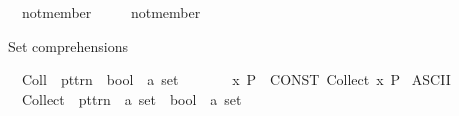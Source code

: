 \begin{isabellebody}
\ \ not{\isacharunderscore}{\kern0pt}member\ \ {\isacharparenleft}{\kern0pt}{\isachardoublequoteopen}{\isacharprime}{\kern0pt}{\isacharparenleft}{\kern0pt}{\isachartilde}{\kern0pt}{\isacharcolon}{\kern0pt}{\isacharprime}{\kern0pt}{\isacharparenright}{\kern0pt}{\isachardoublequoteclose}{\isacharparenright}{\kern0pt}\ \isanewline
\ \ not{\isacharunderscore}{\kern0pt}member\ \ {\isacharparenleft}{\kern0pt}{\isachardoublequoteopen}{\isacharparenleft}{\kern0pt}{\isacharunderscore}{\kern0pt}{\isacharslash}{\kern0pt}\ {\isachartilde}{\kern0pt}{\isacharcolon}{\kern0pt}\ {\isacharunderscore}{\kern0pt}{\isacharparenright}{\kern0pt}{\isachardoublequoteclose}\ {\isacharbrackleft}{\kern0pt}{}{}{\isacharcomma}{\kern0pt}\ {}{}{\isacharbrackright}{\kern0pt}\ {}{}{\isacharparenright}{\kern0pt}%
\begin{isamarkuptext}%
Set comprehensions%
\end{isamarkuptext}\isamarkuptrue%
\isamarkupfalse%
\isanewline
\ \ {\isachardoublequoteopen}{\isacharunderscore}{\kern0pt}Coll{\isachardoublequoteclose}\ {\isacharcolon}{\kern0pt}{\isacharcolon}{\kern0pt}\ {\isachardoublequoteopen}pttrn\ {\isasymRightarrow}\ bool\ {\isasymRightarrow}\ {\isacharprime}{\kern0pt}a\ set{\isachardoublequoteclose}\ \ \ \ {\isacharparenleft}{\kern0pt}{\isachardoublequoteopen}{\isacharparenleft}{\kern0pt}{}{\isacharbraceleft}{\kern0pt}{\isacharunderscore}{\kern0pt}{\isachardot}{\kern0pt}{\isacharslash}{\kern0pt}\ {\isacharunderscore}{\kern0pt}{\isacharbraceright}{\kern0pt}{\isacharparenright}{\kern0pt}{\isachardoublequoteclose}{\isacharparenright}{\kern0pt}\isanewline
{}\isamarkupfalse%
\isanewline
\ \ {\isachardoublequoteopen}{\isacharbraceleft}{\kern0pt}x{\isachardot}{\kern0pt}\ P{\isacharbraceright}{\kern0pt}{\isachardoublequoteclose}\ {\isasymrightleftharpoons}\ {\isachardoublequoteopen}CONST\ Collect\ {\isacharparenleft}{\kern0pt}{\isasymlambda}x{\isachardot}{\kern0pt}\ P{\isacharparenright}{\kern0pt}{\isachardoublequoteclose}\isanewline
\isanewline
{}\isamarkupfalse%
\ {\isacharparenleft}{\kern0pt}ASCII{\isacharparenright}{\kern0pt}\isanewline
\ \ {\isachardoublequoteopen}{\isacharunderscore}{\kern0pt}Collect{\isachardoublequoteclose}\ {\isacharcolon}{\kern0pt}{\isacharcolon}{\kern0pt}\ {\isachardoublequoteopen}pttrn\ {\isasymRightarrow}\ {\isacharprime}{\kern0pt}a\ set\ {\isasymRightarrow}\ bool\ {\isasymRightarrow}\ {\isacharprime}{\kern0pt}a\ set{\isachardoublequoteclose}\ \ {\isacharparenleft}{\kern0pt}{\isachardoublequoteopen}{\isacharparenleft}{\kern0pt}{}{\isacharbraceleft}{\kern0pt}{\isacharparenleft}{\kern0pt}{\isacharunderscore}{\kern0pt}{\isacharslash}{\kern0pt}{\isacharcolon}{\kern0pt}\ {\isacharunderscore}{\kern0pt}{\isacharparenright}{\kern0pt}{\isachardot}{\kern0pt}{\isacharslash}{\kern0pt}\ {\isacharunderscore}{\kern0pt}{\isacharbraceright}{\kern0pt}{\isacharparenright}{\kern0pt}{\isachardoublequoteclose}{\isacharparenright}{\kern0pt}\isanewline

\end{isabellebody}
